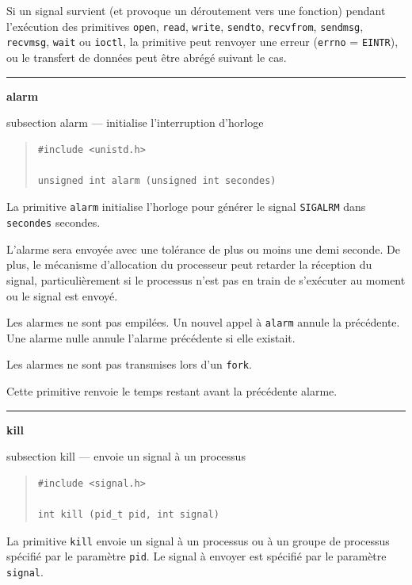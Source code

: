 \documentclass [twoside] {report}
\newcommand {\primitive} [1]
    {
	\phantomsection
	{\large \textbf {#1}}
	\addcontentsline {toc} {subsection} {#1}
    }
\newcommand {\separation}
    {
	\vspace {5mm}
	\nopagebreak
	\hrule
    }
\begin{document}
Si un signal survient (et provoque un déroutement
vers une fonction) pendant l'exécution des primitives
\texttt {open},
\texttt {read},
\texttt {write},
\texttt {sendto},
\texttt {recvfrom},
\texttt {sendmsg},
\texttt {recvmsg},
\texttt {wait} ou
\texttt {ioctl},
la primitive peut renvoyer une erreur (\texttt {errno} = \texttt {EINTR}),
ou le transfert de données peut être abrégé suivant le cas.



\separation
\primitive {alarm} --- initialise l'interruption d'horloge

\begin {quote}
\begin {verbatim}
#include <unistd.h>

unsigned int alarm (unsigned int secondes)
\end{verbatim}
\end {quote}

La primitive \texttt {alarm} initialise l'horloge pour
générer le signal \texttt {SIGALRM} dans \texttt {secondes}
secondes.

L'alarme sera envoyée avec une tolérance de plus ou
moins une demi seconde. De plus, le mécanisme
d'allocation du processeur peut retarder la
réception du signal, particulièrement si le
processus n'est pas en train de s'exécuter au
moment ou le signal est envoyé.

Les alarmes ne sont pas empilées. Un nouvel appel
à \texttt {alarm} annule la précédente. Une alarme nulle
annule l'alarme précédente si elle existait.

Les alarmes ne sont pas transmises lors d'un
\texttt {fork}.

Cette primitive renvoie le temps restant avant la
précédente alarme.




\separation
\primitive {kill} --- envoie un signal à un processus
    \label {kill}

\begin {quote}
\begin {verbatim}
#include <signal.h>

int kill (pid_t pid, int signal)
\end{verbatim}
\end {quote}

La primitive \texttt {kill} envoie un signal à un
processus ou à un groupe de processus spécifié par
le paramètre \texttt {pid}. Le signal à envoyer est
spécifié par le paramètre \texttt {signal}.
\end{document}
